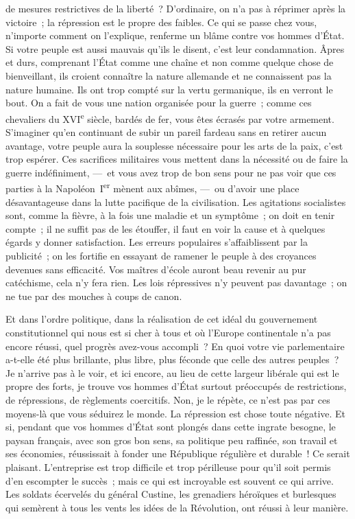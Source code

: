 \documentclass[french,twoside]{book} %
\newcommand\orgName[1]{#1}
\newcommand\persName[1]{#1}
\begin{document}
de mesures restrictives de la liberté ? D’ordinaire, on n’a pas à réprimer après la victoire ; la répression est le propre des faibles. Ce qui se passe chez vous, n’importe comment on l’explique, renferme un blâme contre vos hommes d’État. Si votre peuple est aussi mauvais qu’ils le disent, c’est leur condamnation. Âpres et durs, comprenant l’État comme une chaîne et non comme quelque chose de bienveillant, ils croient connaître la nature allemande et ne connaissent pas la nature humaine. Ils ont trop compté sur la vertu germanique, ils en verront le bout. On a fait de vous une nation organisée pour la guerre ; comme ces chevaliers du XVI\textsuperscript{e} siècle, bardés de fer, vous êtes écrasés par votre armement. S’imaginer qu’en continuant de subir un pareil fardeau sans en retirer aucun avantage, votre peuple aura la souplesse nécessaire pour les arts de la paix, c’est trop espérer. Ces sacrifices militaires vous mettent dans la nécessité ou de faire la guerre indéfiniment, — et vous avez trop de bon sens pour ne pas voir que ces parties à la {\persName Napoléon I\textsuperscript{er}} mènent aux abîmes, — ou d’avoir une place désavantageuse dans la lutte pacifique de la civilisation. Les agitations socialistes sont, comme la fièvre, à la fois une maladie et un symptôme ; on doit en tenir compte ; il ne suffit pas de les étouffer, il faut en voir la cause et à quelques égards y donner satisfaction. Les erreurs populaires s’affaiblissent par la publicité ; on les fortifie en essayant de ramener le peuple à des croyances devenues sans efficacité. Vos maîtres d’école auront beau revenir au pur catéchisme, cela n’y fera rien. Les lois répressives n’y peuvent pas davantage ; on ne tue par des mouches à coups de canon.\par
Et dans l’ordre politique, dans la réalisation de cet idéal du gouvernement constitutionnel qui nous est si cher à tous et où l’{\orgName Europe continentale} n’a pas encore réussi, quel progrès avez-vous accompli ? En quoi votre vie parlementaire a-t-elle été plus brillante, plus libre, plus féconde que celle des autres peuples ? Je n’arrive pas à le voir, et ici encore, au lieu de cette largeur libérale qui est le propre des forts, je trouve vos hommes d’État surtout préoccupés de restrictions, de répressions, de règlements coercitifs. Non, je le répète, ce n’est pas par ces moyens-là que vous séduirez le monde. La répression est chose toute négative. Et si, pendant que vos hommes d’État sont plongés dans cette ingrate besogne, le paysan français, avec son gros bon sens, sa politique peu raffinée, son travail et ses économies, réussissait à fonder une République régulière et durable ! Ce serait plaisant. L’entreprise est trop difficile et trop périlleuse pour qu’il soit permis d’en escompter le succès ; mais ce qui est incroyable est souvent ce qui arrive. Les soldats écervelés du général Custine, les grenadiers héroïques et burlesques qui semèrent à tous les vents les idées de la Révolution, ont réussi à leur manière.\par
\end{document}
